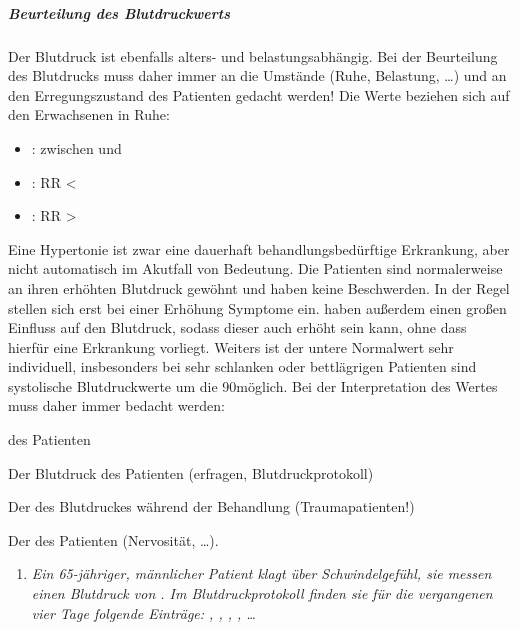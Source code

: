 {\subparagraph{{Beurteilung des Blutdruckwerts}}
\label{topic:blutdruck-beurteilung}
Der Blutdruck ist ebenfalls alters- und belastungsabhängig. 
%
Bei der Beurteilung des Blutdrucks muss daher immer an die Umstände 
(Ruhe, Belastung, \ldots) und an den
Erregungszustand des Patienten gedacht werden!
%
Die Werte beziehen sich auf den Erwachsenen in Ruhe: 
\begin{itemize}
    \item {}: zwischen  und
     
    \item {}: RR {\textless}~
    \item {}: RR
    {\textgreater}~
\end{itemize}
Eine Hypertonie ist zwar eine dauerhaft behandlungsbedürftige Erkrankung, aber
nicht automatisch im Akutfall von Bedeutung. Die Patienten sind
normalerweise an ihren erhöhten Blutdruck gewöhnt und haben keine
Beschwerden. In der Regel stellen sich erst bei einer  Erhöhung Symptome ein.
 haben außerdem einen großen Einfluss auf den Blutdruck, 
sodass dieser auch erhöht sein kann, ohne dass hierfür eine Erkrankung vorliegt. 
Weiters ist der untere Normalwert sehr individuell,
insbesonders bei sehr schlanken oder bettlägrigen Patienten
sind systolische Blutdruckwerte um die 90\MmHg* möglich.
Bei der Interpretation des Wertes muss daher immer bedacht
werden:
\begin{compactitem}
    \item {} des Patienten
    \item {}
    \item Der  Blutdruck des Patienten
    (erfragen, Blutdruckprotokoll)
    \item Der  des Blutdruckes während der
    Behandlung (Traumapatienten!)
    \item Der  des Patienten (Nervosität, \ldots).
\end{compactitem}


\begin{enumerate}

\item \emph{Ein 65-jähriger, männlicher Patient klagt über
Schwindelgefühl, sie messen einen Blutdruck von
. Im Blutdruckprotokoll finden sie für die
vergangenen vier Tage folgende Einträge:
, , , , \ldots}


\end{enumerate}}
